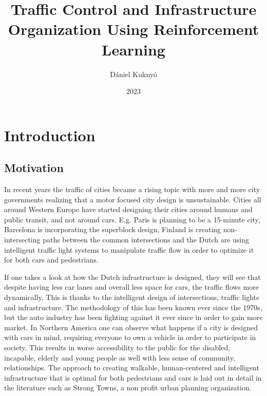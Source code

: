 \documentclass[
]{elteikthesis}[2023/04/10]
\title{Traffic Control and Infrastructure Organization Using Reinforcement Learning} %
\date{2023} %
\author{Dániel Kuknyó}
\affiliation{Head Senior Researcher} %
\begin{document}


\maketitle
%

\tableofcontents{}\newpage{}

\chapter{Introduction}

\section{Motivation}

In recent years the traffic of cities became a rising topic with more
and more city governments realizing that a motor focused city design
is unsustainable. Cities all around Western Europe have started designing
their cities around humans and public transit, and not around cars.
E.g. Paris is planning to be a 15-minute city, Barcelona is incorporating
the superblock design, Finland is creating non-intersecting paths
between the common intersections and the Dutch are using intelligent
traffic light systems to manipulate traffic flow in order to optimize
it for both cars and pedestrians. 

If one takes a look at how the Dutch infrastructure is designed, they
will see that despite having less car lanes and overall less space
for cars, the traffic flows more dynamically. This is thanks to the
intelligent design of intersections, traffic lights and infrastructure.
The methodology of this has been known ever since the 1970s, but the
auto industry has been fighting against it ever since in order to
gain more market. In Northern America one can observe what happens
if a city is designed with cars in mind, requiring everyone to own
a vehicle in order to participate in society. This results in worse
accessibility to the public for the disabled, incapable, elderly and
young people as well with less sense of community, relationships.
The approach to creating walkable, human-centered and intelligent
infrastructure that is optimal for both pedestrians and cars is laid
out in detail in the literature such as Strong Towns, a non profit
urban planning organization.
\end{document}
